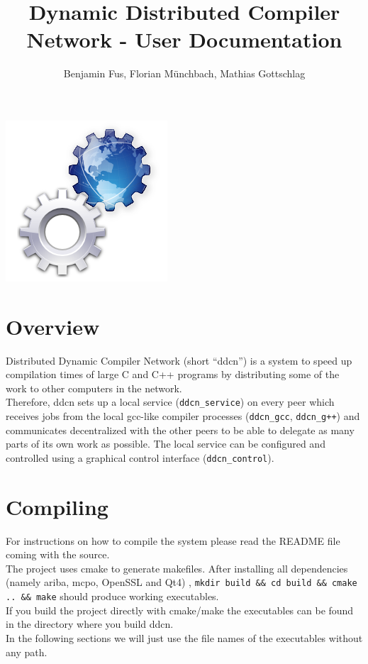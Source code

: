 \documentclass[a4paper,9pt]{scrartcl}
\title{Dynamic Distributed Compiler Network - User Documentation}
\author{Benjamin Fus, Florian Münchbach, Mathias Gottschlag}
\begin{document}
\maketitle
\begin{center}
\includegraphics[scale=0.3,keepaspectratio=true]{../docs/icon/icon.png} 
\end{center}


\section{Overview}

Distributed Dynamic Compiler Network (short ``ddcn'') is a system to speed up compilation times of large C and C++ programs by distributing some of the work to other computers in the network.\\Therefore, ddcn sets up a local service (\texttt{ddcn\_service}) on every peer which receives jobs from the local gcc-like compiler processes (\texttt{ddcn\_gcc}, \texttt{ddcn\_g++}) and communicates decentralized with the other peers to be able to delegate as many parts of its own work as possible. The local service can be configured and controlled using a graphical control interface (\texttt{ddcn\_control}).

\section{Compiling}

For instructions on how to compile the system please read the README file coming with the source.\\The project uses cmake to generate makefiles. After installing all dependencies (namely ariba, mcpo, OpenSSL and Qt4)
, \texttt{mkdir build \&\& cd build \&\& cmake .. \&\& make} should produce working executables.\\
If you build the project directly with cmake/make the executables can be found in the directory where you build ddcn.\\
In the following sections we will just use the file names of the executables without any path.
\end{document}
